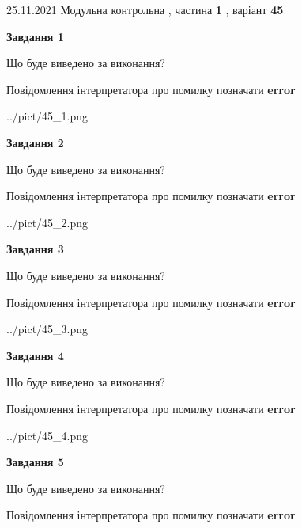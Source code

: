 \documentclass[10pt, ukrainian]{article}
\begin{document}
{25.11.2021 Модульна контрольна , частина \textbf { 1 }, варіант  \No \textbf { 45 }\par}
{
\begin {large}

{\begin {center}\textbf{Завдання 1}\end {center}}\par
Що буде виведено за виконання? \par
Повідомлення інтерпретатора про помилку позначати \textbf{error}

\begin{center}
	{../pict/45_1.png}
\end{center}
\newpage

{\begin {center}\textbf{Завдання 2}\end {center}}\par
Що буде виведено за виконання? \par
Повідомлення інтерпретатора про помилку позначати \textbf{error}

\begin{center}
	{../pict/45_2.png}
\end{center}
\newpage

{\begin {center}\textbf{Завдання 3}\end {center}}\par
Що буде виведено за виконання? \par
Повідомлення інтерпретатора про помилку позначати \textbf{error}

\begin{center}
	{../pict/45_3.png}
\end{center}
\newpage

{\begin {center}\textbf{Завдання 4}\end {center}}\par
Що буде виведено за виконання? \par
Повідомлення інтерпретатора про помилку позначати \textbf{error}

\begin{center}
	{../pict/45_4.png}
\end{center}
\newpage

{\begin {center}\textbf{Завдання 5}\end {center}}\par
Що буде виведено за виконання? \par
Повідомлення інтерпретатора про помилку позначати \textbf{error}


\end{large}}
\end{document}

